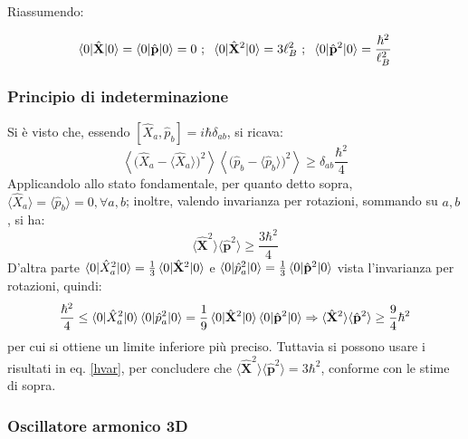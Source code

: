 \documentclass[11pt, a4paper]{scrartcl} %
\numberwithin{equation}{subsection}
\theoremstyle{style2}
\theoremstyle{style1}
\newenvironment{boxenv}[1][]{
    \begin{eqbox}[#1]
    }{
   \end{eqbox}
}
\begin{document}
Riassumendo:
\begin{boxenv}[]
	\begin{equation}\label{hvar}
		\braket{0|\hat{\mathbf{X} }|0} = \braket{0|\hat{\mathbf{p} }|0} = 0\ ; \hspace{.2cm}\braket{0|\hat{\mathbf{X} }^2|0} = 3\ell _B^2 \ ; \hspace{.2cm} \braket{0|\hat{\mathbf{p} }^2|0} = \frac{\hbar ^2}{\ell _B^2}
\end{equation}
\end{boxenv}
\subsubsection{Principio di indeterminazione}
Si \`e visto che, essendo $[\hat{X}_a, \hat{p}_b] = i \hbar  \delta _{ab} $, si ricava:
\begin{equation}
	\left\langle \big(\hat{X}_a - \langle \hat{X}_a \rangle\big)^2 \right\rangle \left\langle \big(\hat{p}_b - \langle \hat{p}_b \rangle\big)^2 \right\rangle \ge \delta _{ab} \frac{\hbar ^2}{4}
\end{equation}
Applicandolo allo stato fondamentale, per quanto detto sopra, $\langle \hat{X}_a \rangle= \langle \hat{p}_b \rangle=0, \forall a,b$; inoltre, valendo invarianza per rotazioni, sommando su $a,b$, si ha:
\begin{equation}
	\langle \hat{\mathbf{X} }^2 \rangle \langle \hat{\mathbf{p} }^2 \rangle\ge \frac{3\hbar ^2}{4}
\end{equation}
D'altra parte $\braket{0|\hat{X}_a^2|0} = \frac{1}{3} \braket{0|\hat{\mathbf{X} }^2|0} $ e $\braket{0|\hat{p}_a^2|0} = \frac{1}{3} \braket{0|\hat{\mathbf{p} }^2|0} $ vista l'invarianza per rotazioni, quindi:
\begin{equation}
	\frac{\hbar^2}{4}\le \braket{0|\hat{X}_a^2|0} \braket{0|\hat{p}_a^2|0} = \frac{1}{9} \braket{0|\hat{\mathbf{X} }^2|0}  \braket{0|\hat{\mathbf{p} }^2|0} \Rightarrow \langle \hat{\mathbf{X} }^2 \rangle \langle \hat{\mathbf{p} }^2 \rangle \ge \frac{9}{4}\hbar ^2
\end{equation}
per cui si ottiene un limite inferiore pi\`u preciso. Tuttavia si possono usare i risultati in eq. \ref{hvar}, per concludere che $\langle \hat{\mathbf{X} }^2 \rangle\langle \hat{\mathbf{p} }^2 \rangle = 3\hbar ^2$, conforme con le stime di sopra.

\subsubsection{Oscillatore armonico 3D}
\end{document}

